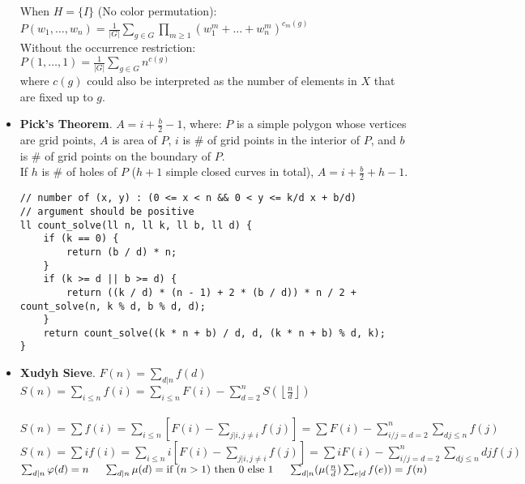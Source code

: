 \documentclass[landscape, 8pt, a4paper, oneside, twocolumn]{extarticle}
\begin{document}
\begin{itemize}
    When $H=\{I\}$ (No color permutation): \\
    $P(w_1,\ldots ,w_n)=\frac{1}{\left|G\right|}\sum_{g\in G}\prod_{m\ge 1}(w_1^m+\ldots +w_n^m)^{c_m(g)}$ \\

    Without the occurrence restriction: \\
    $P(1,\ldots,1)=\frac{1}{\left|G\right|}\sum_{g\in G}n^{c(g)}$ \\
    where $c(g)$ could also be interpreted as the number of elements in $X$ that are fixed up to $g$.
    \item \textbf{Pick's Theorem}. $A=i+\frac{b}{2}-1$, where: $P$ is a simple polygon whose vertices are grid points, $A$ is area of $P$, $i$ is \# of grid points in the interior of $P$, and $b$ is \# of grid points on the boundary of $P$. \\
    If $h$ is \# of holes of $P$ ($h+1$ simple closed curves in total), $A=i+\frac{b}{2}+h-1$.
\begin{verbatim}
// number of (x, y) : (0 <= x < n && 0 < y <= k/d x + b/d)
// argument should be positive
ll count_solve(ll n, ll k, ll b, ll d) {
	if (k == 0) {
		return (b / d) * n;
	}
	if (k >= d || b >= d) {
		return ((k / d) * (n - 1) + 2 * (b / d)) * n / 2 + count_solve(n, k % d, b % d, d);
	}
	return count_solve((k * n + b) / d, d, (k * n + b) % d, k);
}
\end{verbatim}
    \item \textbf{Xudyh Sieve}.
    $F(n)=\sum_{d\vert n}f(d)$ \\
    $S(n)=\sum_{i\leq n}f(i)=\sum_{i\leq n}F(i)-\sum_{d=2}^n S\left(\left\lfloor \frac{n}{d}\right\rfloor\right)$ \\
     \\
    $S(n)=\sum f(i) = \sum_{i\leq n}\left[F(i)-\sum_{j|i,j\neq i}f(j)\right]=\sum F(i) - \sum_{i/j=d=2}^n\sum_{dj\leq n}f(j)$ \\
    $S(n)=\sum if(i) = \sum_{i\leq n}i\left[F(i)-\sum_{j|i,j\neq i}f(j)\right]=\sum iF(i) - \sum_{i/j=d=2}^n\sum_{dj\leq n}djf(j)$ \\
    $\sum_{d\vert n}\varphi (d)=n\hspace{0.5cm}\sum_{d\vert n}\mu (d)=\text{if } (n > 1) \text{ then } 0 \text{ else } 1\hspace{0.5cm}\sum_{d\vert n}(\mu (\frac{n}{d})\sum_{e\vert d}f(e))=f(n)$ \\
\end{itemize}
\end{document}
